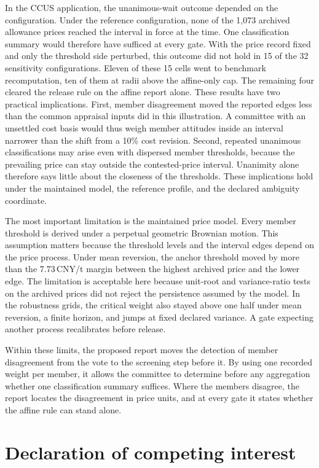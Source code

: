 In the CCUS application, the unanimous-wait outcome depended on the configuration. Under the reference configuration, none of the 1,073 archived allowance prices reached the interval in force at the time. One classification summary would therefore have sufficed at every gate. With the price record fixed and only the threshold side perturbed, this outcome did not hold in 15 of the 32 sensitivity configurations. Eleven of these 15 cells went to benchmark recomputation, ten of them at radii above the affine-only cap. The remaining four cleared the release rule on the affine report alone. These results have two practical implications. First, member disagreement moved the reported edges less than the common appraisal inputs did in this illustration. A committee with an unsettled cost basis would thus weigh member attitudes inside an interval narrower than the shift from a 10\% cost revision. Second, repeated unanimous classifications may arise even with dispersed member thresholds, because the prevailing price can stay outside the contested-price interval. Unanimity alone therefore says little about the closeness of the thresholds. These implications hold under the maintained model, the reference profile, and the declared ambiguity coordinate.

The most important limitation is the maintained price model. Every member threshold is derived under a perpetual geometric Brownian motion. This assumption matters because the threshold levels and the interval edges depend on the price process. Under mean reversion, the anchor threshold moved by more than the 7.73\,CNY/t margin between the highest archived price and the lower edge. The limitation is acceptable here because unit-root and variance-ratio tests on the archived prices did not reject the persistence assumed by the model. In the robustness grids, the critical weight also stayed above one half under mean reversion, a finite horizon, and jumps at fixed declared variance. A gate expecting another process recalibrates before release.

Within these limits, the proposed report moves the detection of member disagreement from the vote to the screening step before it. By using one recorded weight per member, it allows the committee to determine before any aggregation whether one classification summary suffices. Where the members disagree, the report locates the disagreement in price units, and at every gate it states whether the affine rule can stand alone.

\section*{Declaration of competing interest}

